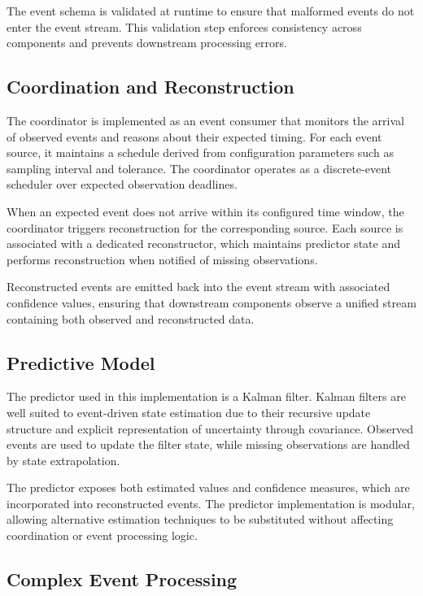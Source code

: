 The event schema is validated at runtime to ensure that malformed events do not enter the event stream. This validation step enforces consistency across components and prevents downstream processing errors.

\subsection{Coordination and Reconstruction}

The coordinator is implemented as an event consumer that monitors the arrival of observed events and reasons about their expected timing. For each event source, it maintains a schedule derived from configuration parameters such as sampling interval and tolerance. The coordinator operates as a discrete-event scheduler over expected observation deadlines.

When an expected event does not arrive within its configured time window, the coordinator triggers reconstruction for the corresponding source. Each source is associated with a dedicated reconstructor, which maintains predictor state and performs reconstruction when notified of missing observations.

Reconstructed events are emitted back into the event stream with associated confidence values, ensuring that downstream components observe a unified stream containing both observed and reconstructed data.

\subsection{Predictive Model}

The predictor used in this implementation is a Kalman filter. Kalman filters are well suited to event-driven state estimation due to their recursive update structure and explicit representation of uncertainty through covariance. Observed events are used to update the filter state, while missing observations are handled by state extrapolation.

The predictor exposes both estimated values and confidence measures, which are incorporated into reconstructed events. The predictor implementation is modular, allowing alternative estimation techniques to be substituted without affecting coordination or event processing logic.

\subsection{Complex Event Processing}

